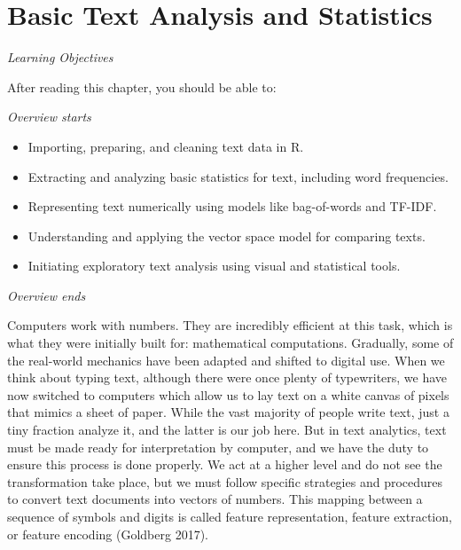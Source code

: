 \chapter{Basic Text Analysis and
Statistics}\label{sec-basic-text-analysis-and-statistics}

\emph{Learning Objectives}

After reading this chapter, you should be able to:

\emph{Overview starts}

\begin{itemize}
\tightlist
\item
  Importing, preparing, and cleaning text data in R.
\item
  Extracting and analyzing basic statistics for text, including word frequencies.
\item
  Representing text numerically using models like bag-of-words and TF-IDF.
\item
  Understanding and applying the vector space model for comparing texts.
\item
  Initiating exploratory text analysis using visual and statistical tools.
\end{itemize}

\emph{Overview ends}

Computers work with numbers. They are incredibly efficient at this task,
which is what they were initially built for: mathematical
computations. Gradually, some of the real-world mechanics have been
adapted and shifted to digital use. When we think about typing text,
although there were once plenty of typewriters, we have now switched to
computers which allow us to lay text on a white canvas of pixels that
mimics a sheet of paper. While the vast majority of people write
text, just a tiny fraction analyze it, and the latter is our job here.
But in text analytics, text must be made ready for interpretation by computer, and we have the duty to ensure this process is done
properly. We act at a higher level and do not see the transformation take place,
but we must follow specific strategies and procedures to convert text
documents into vectors of numbers. This mapping between a sequence of
symbols and digits is called feature representation, feature extraction,
or feature encoding (Goldberg 2017).

